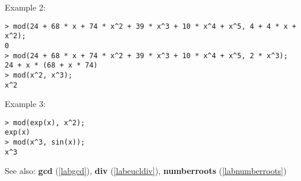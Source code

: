 \noindent Example 2: 
\begin{center}\begin{minipage}{15cm}\begin{Verbatim}[frame=single]
> mod(24 + 68 * x + 74 * x^2 + 39 * x^3 + 10 * x^4 + x^5, 4 + 4 * x + x^2);
0
> mod(24 + 68 * x + 74 * x^2 + 39 * x^3 + 10 * x^4 + x^5, 2 * x^3);
24 + x * (68 + x * 74)
> mod(x^2, x^3);
x^2
\end{Verbatim}
\end{minipage}\end{center}
\noindent Example 3: 
\begin{center}\begin{minipage}{15cm}\begin{Verbatim}[frame=single]
> mod(exp(x), x^2);
exp(x)
> mod(x^3, sin(x));
x^3
\end{Verbatim}
\end{minipage}\end{center}
See also: \textbf{gcd} (\ref{labgcd}), \textbf{div} (\ref{labeucldiv}), \textbf{numberroots} (\ref{labnumberroots})
